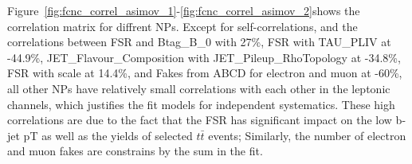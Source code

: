 Figure~\ref{fig:fcnc_correl_asimov_1}-\ref{fig:fcnc_correl_asimov_2}shows the correlation matrix for diffrent NPs. Except for self-correlations, and the correlations between FSR and Btag\_B\_0 with 27\%, FSR with TAU\_PLIV at -44.9\%, JET\_Flavour\_Composition with JET\_Pileup\_RhoTopology at -34.8\%,   
FSR with scale at 14.4\%, and Fakes from ABCD for electron and muon at -60\%, all other NPs have relatively small correlations with each other in the leptonic channels, which justifies the fit models for independent systematics. These high correlations are due to the fact that the FSR has significant impact on the low b-jet pT as well as the yields of selected
$t\bar t$ events; Similarly, the number of electron and muon fakes are constrains by the sum in the fit.   



%
%

%
%






